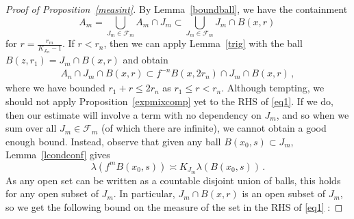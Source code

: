 \documentclass[10pt,a4paper]{amsart}
\begin{document}
    \begin{proof}[Proof of Proposition~\ref{measint}]
    By Lemma~\ref{boundball}, we have the containment 
        $$
        A_m = \bigcup\limits_{J_m \in \mathcal{F}_m} A_m \cap J_m \subset \bigcup\limits_{J_m \in \mathcal{F}_m} J_m \cap B(x,r) \, 
        $$
        for $r= \frac{r_m}{K_{J_m}-1}$.
If $r< r_n$, then we can apply Lemma~\ref{trig} with the ball $B(z,r_1)=J_m \cap B(x,r)$ and obtain 
\begin{eqnarray}\label{eq1}
    A_n \cap J_m \cap B(x,r) \subset f^{-n}B(x,2r_n)  \cap J_m \cap B(x,r) \, , 
\end{eqnarray}
where we have bounded $r_1+r \leq 2r_n$ as $r_1\leq r< r_n$.
Although tempting, we should not apply Proposition~\ref{expmixcomp} yet to the RHS of \eqref{eq1}. If we do, then our estimate will involve a term with no dependency on $J_m$, and so when we sum over all  $J_m \in \mathcal{F}_m$ (of which there are infinite), we cannot obtain a good enough bound. 
Instead, observe that given any ball $B(x_0,s) \subset J_m$, Lemma~\ref{lcondconf} gives
$$
\lambda(f^mB(x_0,s)) \asymp K_{J_m}\lambda(B(x_0,s)) \, .
$$
As any open set can be written as a countable disjoint union of balls, this holds for any open subset of $J_m$. In particular, $J_m \cap B(x,r)$ is an open subset of $ J_m$, so we get the following bound on the measure of the set in the RHS of \eqref{eq1} :


\end{proof}
\end{document}
